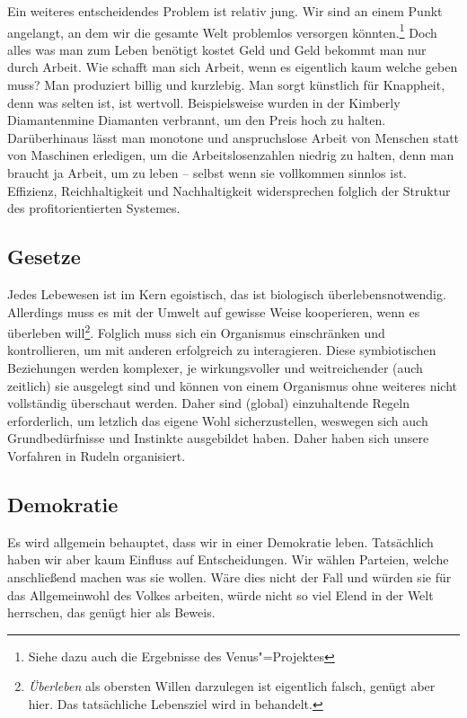 Ein weiteres entscheidendes Problem ist relativ jung. Wir sind an einem Punkt angelangt, an dem wir die gesamte Welt problemlos versorgen könnten.\footnote{Siehe dazu auch die Ergebnisse des Venus"=Projektes} Doch alles was man zum Leben benötigt kostet Geld und Geld bekommt man nur durch Arbeit. Wie schafft man sich Arbeit, wenn es eigentlich kaum welche geben muss? Man produziert billig und kurzlebig. Man sorgt künstlich für Knappheit, denn was selten ist, ist wertvoll. Beispielsweise wurden in der Kimberly Diamantenmine Diamanten verbrannt, um den Preis hoch zu halten. Darüberhinaus lässt man monotone und anspruchslose Arbeit von Menschen statt von Maschinen erledigen, um die Arbeitslosenzahlen niedrig zu halten, denn man braucht ja Arbeit, um zu leben -- selbst wenn sie vollkommen sinnlos ist. Effizienz, Reichhaltigkeit und Nachhaltigkeit widersprechen folglich der Struktur des profitorientierten Systemes.

\subsection{Gesetze}\label{sec:situation/laws}

Jedes Lebewesen ist im Kern egoistisch, das ist biologisch überlebensnotwendig. Allerdings muss es mit der Umwelt auf gewisse Weise kooperieren, wenn es überleben will\footnote{\textit{Überleben} als obersten Willen darzulegen ist eigentlich falsch, genügt aber hier. Das tatsächliche Lebensziel wird in  behandelt.}. Folglich muss sich ein Organismus einschränken und kontrollieren, um mit anderen erfolgreich zu interagieren. Diese symbiotischen Beziehungen werden komplexer, je wirkungsvoller und weitreichender (auch zeitlich) sie ausgelegt sind und können von einem Organismus ohne weiteres nicht vollständig überschaut werden. Daher sind (global) einzuhaltende Regeln erforderlich, um letzlich das eigene Wohl sicherzustellen, weswegen sich auch Grundbedürfnisse und Instinkte ausgebildet haben. Daher haben sich unsere Vorfahren in Rudeln organisiert.

\subsection{Demokratie}\label{sec:situation/democracy}

Es wird allgemein behauptet, dass wir in einer Demokratie leben. Tatsächlich haben wir aber kaum Einfluss auf Entscheidungen. Wir wählen Parteien, welche anschließend machen was sie wollen. Wäre dies nicht der Fall und würden sie für das Allgemeinwohl des Volkes arbeiten, würde nicht so viel Elend in der Welt herrschen, das genügt hier als Beweis.

